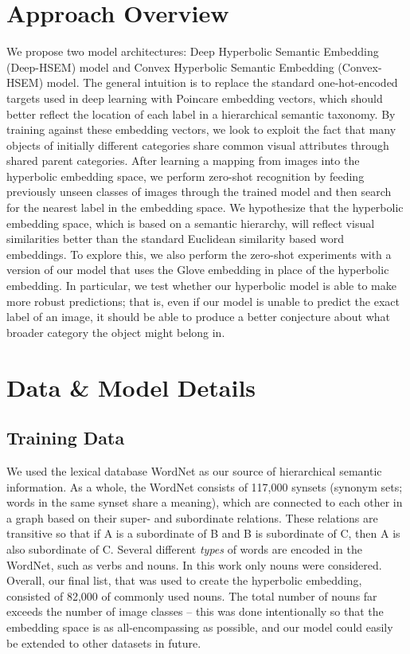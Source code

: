 \documentclass[12pt]{report}
\begin{document}
\section{Approach Overview}
We propose two model architectures: Deep Hyperbolic Semantic Embedding (Deep-HSEM) model and Convex Hyperbolic Semantic Embedding (Convex-HSEM) model. The general intuition is to replace the standard one-hot-encoded targets used in deep learning with Poincare embedding vectors, which should better reflect the location of each label in a hierarchical semantic taxonomy. By training against these embedding vectors, we look to exploit the fact that many objects of initially different categories share common visual attributes through shared parent categories. After learning a mapping from images into the hyperbolic embedding space, we perform zero-shot recognition by feeding previously unseen classes of images through the trained model and then search for the nearest label in the embedding space. We hypothesize that the hyperbolic embedding space, which is based on a semantic hierarchy, will reflect visual similarities better than the standard Euclidean similarity based word embeddings. To explore this, we also perform the zero-shot experiments with a version of our model that uses the Glove embedding \cite{Pennington2014} in place of the hyperbolic embedding. In particular, we test whether our hyperbolic model is able to make more robust predictions; that is, even if our model is unable to predict the exact label of an image, it should be able to produce a better conjecture about what broader category the object might belong in.

\section{Data \& Model Details}
\subsection{Training Data}
We used the lexical database WordNet \cite{Miller1995} as our source of hierarchical semantic information. As a whole, the WordNet consists of 117,000 synsets (synonym sets; words in the same synset share a meaning), which are connected to each other in a graph based on their super- and subordinate relations. These relations are transitive so that if A is a subordinate of B and B is subordinate of C, then A is also subordinate of C. Several different \textit{types} of words are encoded in the WordNet, such as verbs and nouns. In this work only nouns were considered. Overall, our final list, that was used to create the hyperbolic embedding, consisted of 82,000 of commonly used nouns. The total number of nouns far exceeds the number of image classes -- this was done intentionally so that the embedding space is as all-encompassing as possible, and our model could easily be extended to other datasets in future.
\end{document}
